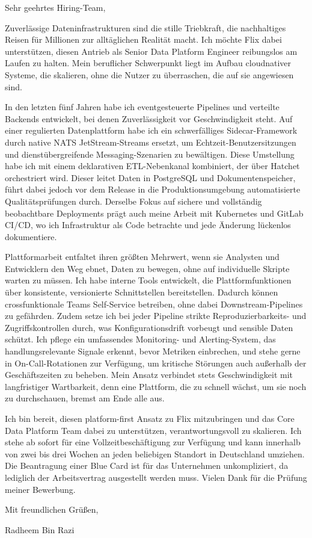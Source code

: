 \documentclass[11pt,a4paper]{coverletter}
\begin{document}
\clearpage
{}


\opening{Sehr geehrtes Hiring-Team,}

Zuverlässige Dateninfrastrukturen sind die stille Triebkraft, die nachhaltiges Reisen für Millionen zur alltäglichen Realität macht. Ich möchte Flix dabei unterstützen, diesen Antrieb als Senior Data Platform Engineer reibungslos am Laufen zu halten. Mein beruflicher Schwerpunkt liegt im Aufbau cloudnativer Systeme, die skalieren, ohne die Nutzer zu überraschen, die auf sie angewiesen sind.

In den letzten fünf Jahren habe ich eventgesteuerte Pipelines und verteilte Backends entwickelt, bei denen Zuverlässigkeit vor Geschwindigkeit steht. Auf einer regulierten Datenplattform habe ich ein schwerfälliges Sidecar-Framework durch native NATS JetStream-Streams ersetzt, um Echtzeit-Benutzersitzungen und dienstübergreifende Messaging-Szenarien zu bewältigen. Diese Umstellung habe ich mit einem deklarativen ETL-Nebenkanal kombiniert, der über Hatchet orchestriert wird. Dieser leitet Daten in PostgreSQL und Dokumentenspeicher, führt dabei jedoch vor dem Release in die Produktionsumgebung automatisierte Qualitätsprüfungen durch. Derselbe Fokus auf sichere und vollständig beobachtbare Deployments prägt auch meine Arbeit mit Kubernetes und GitLab CI/CD, wo ich Infrastruktur als Code betrachte und jede Änderung lückenlos dokumentiere.

Plattformarbeit entfaltet ihren größten Mehrwert, wenn sie Analysten und Entwicklern den Weg ebnet, Daten zu bewegen, ohne auf individuelle Skripte warten zu müssen. Ich habe interne Tools entwickelt, die Plattformfunktionen über konsistente, versionierte Schnittstellen bereitstellen. Dadurch können crossfunktionale Teams Self-Service betreiben, ohne dabei Downstream-Pipelines zu gefährden. Zudem setze ich bei jeder Pipeline strikte Reproduzierbarkeits- und Zugriffskontrollen durch, was Konfigurationsdrift vorbeugt und sensible Daten schützt. Ich pflege ein umfassendes Monitoring- und Alerting-System, das handlungsrelevante Signale erkennt, bevor Metriken einbrechen, und stehe gerne in On-Call-Rotationen zur Verfügung, um kritische Störungen auch außerhalb der Geschäftszeiten zu beheben. Mein Ansatz verbindet stets Geschwindigkeit mit langfristiger Wartbarkeit, denn eine Plattform, die zu schnell wächst, um sie noch zu durchschauen, bremst am Ende alle aus.

Ich bin bereit, diesen platform-first Ansatz zu Flix mitzubringen und das Core Data Platform Team dabei zu unterstützen, verantwortungsvoll zu skalieren. Ich stehe ab sofort für eine Vollzeitbeschäftigung zur Verfügung und kann innerhalb von zwei bis drei Wochen an jeden beliebigen Standort in Deutschland umziehen. Die Beantragung einer Blue Card ist für das Unternehmen unkompliziert, da lediglich der Arbeitsvertrag ausgestellt werden muss. Vielen Dank für die Prüfung meiner Bewerbung.

\closing{Mit freundlichen Grüßen,}{Radheem Bin Razi}
\end{document}
